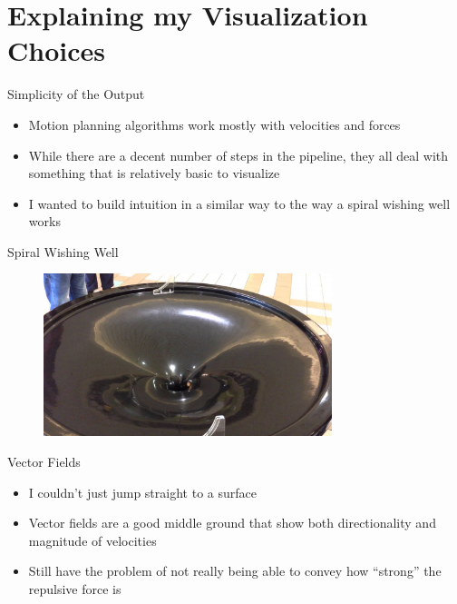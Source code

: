 \documentclass[aspectratio=169,xcolor=dvipsnames]{beamer}
\begin{document}
\section{Explaining my Visualization Choices}

\begin{frame}{Simplicity of the Output}
  \begin{itemize}
    \item Motion planning algorithms work mostly with velocities and forces
    \item While there are a decent number of steps in the pipeline, they all deal with something that is relatively basic to visualize
    \item I wanted to build intuition in a similar way to the way a spiral wishing well works
  \end{itemize}
\end{frame}

\begin{frame}{Spiral Wishing Well}
  \begin{figure}
    \includegraphics[width=0.75\textwidth]{imgs/spiral_wishing_well.jpg}
  \end{figure}
\end{frame}

\begin{frame}{Vector Fields}
  \begin{itemize}
    \item I couldn't just jump straight to a surface
    \item Vector fields are a good middle ground that show both directionality and magnitude of velocities 
    \item Still have the problem of not really being able to convey how ``strong'' the repulsive force is
  \end{itemize}
\end{frame}
\end{document}
